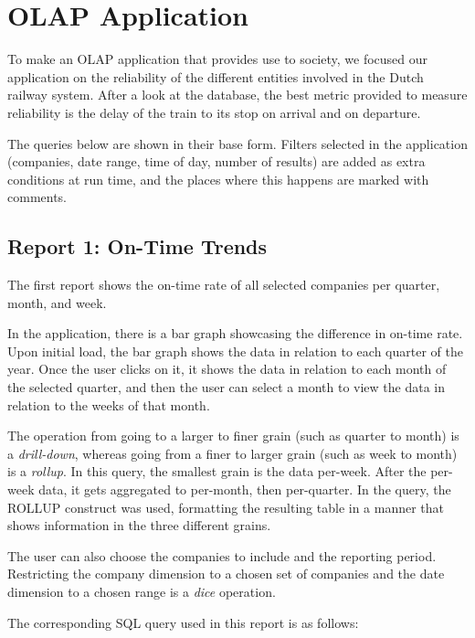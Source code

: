 \section{OLAP Application}
\label{sec:olap_application}

To make an OLAP application that provides use to society, we focused our application on the reliability of the different entities involved in the Dutch railway system. After a look at the database, the best metric provided to measure reliability is the delay of the train to its stop on arrival and on departure.

The queries below are shown in their base form. Filters selected in the application (companies, date range, time of day, number of results) are added as extra conditions at run time, and the places where this happens are marked with comments.




\subsection{Report 1: On-Time Trends}
\label{subsubsec:on-time_trends}
The first report shows the on-time rate of all selected companies per quarter, month, and week.

In the application, there is a bar graph showcasing the difference in on-time rate. Upon initial load, the bar graph shows the data in relation to each quarter of the year. Once the user clicks on it, it shows the data in relation to each month of the selected quarter, and then the user can select a month to view the data in relation to the weeks of that month.

The operation from going to a larger to finer grain (such as quarter to month) is a \emph{drill-down}, whereas going from a finer to larger grain (such as week to month) is a \emph{rollup}. In this query, the smallest grain is the data per-week. After the per-week data, it gets aggregated to per-month, then per-quarter. In the query, the ROLLUP construct was used, formatting the resulting table in a manner that shows information in the three different grains.

The user can also choose the companies to include and the reporting period. Restricting the company dimension to a chosen set of companies and the date dimension to a chosen range is a \emph{dice} operation.

The corresponding SQL query used in this report is as follows:


